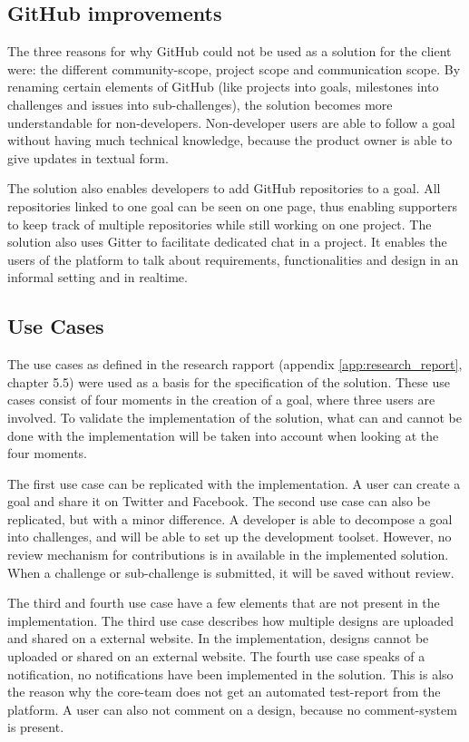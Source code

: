 \subsection{GitHub improvements}
The three reasons for why GitHub could not be used as a solution for the client were: the different community-scope, project scope and communication scope. By renaming certain elements of GitHub (like projects into goals, milestones into challenges and issues into sub-challenges), the solution becomes more understandable for non-developers. Non-developer users are able to follow a goal without having much technical knowledge, because the product owner is able to give updates in textual form.

The solution also enables developers to add GitHub repositories to a goal. All repositories linked to one goal can be seen on one page, thus enabling supporters to keep track of multiple repositories while still working on one project. The solution also uses Gitter to facilitate dedicated chat in a project. It enables the users of the platform to talk about requirements, functionalities and design in an informal setting and in realtime.

\subsection{Use Cases}
The use cases as defined in the research rapport (appendix \ref{app:research_report}, chapter 5.5) were used as a basis for the specification of the solution. These use cases consist of four moments in the creation of a goal, where three users are involved. To validate the implementation of the solution, what can and cannot be done with the implementation will be taken into account when looking at the four moments.

The first use case can be replicated with the implementation. A user can create a goal and share it on Twitter and Facebook. The second use case can also be replicated, but with a minor difference. A developer is able to decompose a goal into challenges, and will be able to set up the development toolset. However, no review mechanism for contributions is in available in the implemented solution. When a challenge or sub-challenge is submitted, it will be saved without review.

The third and fourth use case have a few elements that are not present in the implementation. The third use case describes how multiple designs are uploaded and shared on a external website. In the implementation, designs cannot be uploaded or  shared on an external website. The fourth use case speaks of a notification, no notifications have been implemented in the solution. This is also the reason why the core-team does not get an automated test-report from the platform. A user can also not comment on a design, because no comment-system is present.

